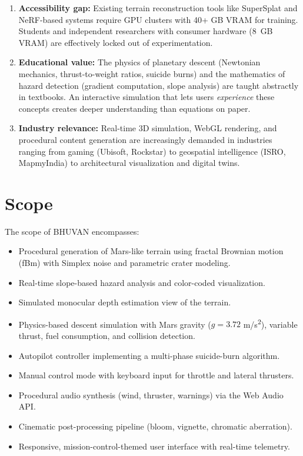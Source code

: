 \begin{enumerate}
    \item \textbf{Accessibility gap:} Existing terrain reconstruction tools like SuperSplat \cite{supersplat} and NeRF-based systems \cite{mildenhall2020nerf} require GPU clusters with 40+ GB VRAM for training. Students and independent researchers with consumer hardware (8~GB VRAM) are effectively locked out of experimentation.

    \item \textbf{Educational value:} The physics of planetary descent (Newtonian mechanics, thrust-to-weight ratios, suicide burns) and the mathematics of hazard detection (gradient computation, slope analysis) are taught abstractly in textbooks. An interactive simulation that lets users \textit{experience} these concepts creates deeper understanding than equations on paper.

    \item \textbf{Industry relevance:} Real-time 3D simulation, WebGL rendering, and procedural content generation are increasingly demanded in industries ranging from gaming (Ubisoft, Rockstar) to geospatial intelligence (ISRO, MapmyIndia) to architectural visualization and digital twins.
\end{enumerate}

\section{Scope}
The scope of BHUVAN encompasses:

\begin{itemize}
    \item Procedural generation of Mars-like terrain using fractal Brownian motion (fBm) with Simplex noise and parametric crater modeling.
    \item Real-time slope-based hazard analysis and color-coded visualization.
    \item Simulated monocular depth estimation view of the terrain.
    \item Physics-based descent simulation with Mars gravity ($g = 3.72$ m/s\textsuperscript{2}), variable thrust, fuel consumption, and collision detection.
    \item Autopilot controller implementing a multi-phase suicide-burn algorithm.
    \item Manual control mode with keyboard input for throttle and lateral thrusters.
    \item Procedural audio synthesis (wind, thruster, warnings) via the Web Audio API.
    \item Cinematic post-processing pipeline (bloom, vignette, chromatic aberration).
    \item Responsive, mission-control-themed user interface with real-time telemetry.
\end{itemize}

